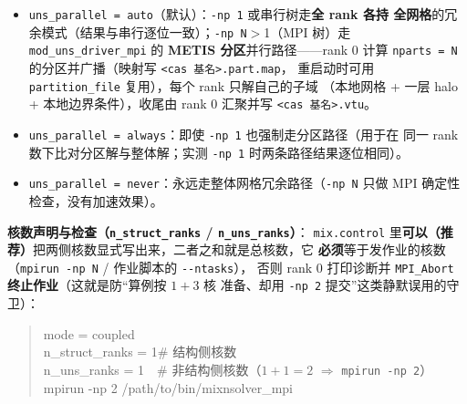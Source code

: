 \documentclass[11pt,a4paper]{ctexart}
\begin{document}
\begin{itemize}\itemsep2pt
  \item \texttt{uns\_parallel = auto}（默认）：\texttt{-np 1} 或串行树走\textbf{全 rank 各持
        全网格}的冗余模式（结果与串行逐位一致）；\texttt{-np N}$>$1（MPI 树）走
        \texttt{mod\_uns\_driver\_mpi} 的 \textbf{METIS 分区}并行路径——rank 0 计算
        \texttt{nparts = N} 的分区并广播（映射写 \texttt{<cas 基名>.part.map}，
        重启动时可用 \texttt{partition\_file} 复用），每个 rank 只解自己的子域
        （本地网格 + 一层 halo + 本地边界条件），收尾由 rank 0 汇聚并写
        \texttt{<cas 基名>.vtu}。
  \item \texttt{uns\_parallel = always}：即使 \texttt{-np 1} 也强制走分区路径（用于在
        同一 rank 数下比对分区解与整体解；实测 \texttt{-np 1} 时两条路径结果逐位相同）。
  \item \texttt{uns\_parallel = never}：永远走整体网格冗余路径（\texttt{-np N} 只做 MPI
        确定性检查，没有加速效果）。
\end{itemize}

\textbf{核数声明与检查（\texttt{n\_struct\_ranks} / \texttt{n\_uns\_ranks}）}：
\texttt{mix.control} 里\textbf{可以（推荐）}把两侧核数显式写出来，二者之和就是总核数，它
\textbf{必须}等于发作业的核数（\texttt{mpirun -np N} / 作业脚本的 \texttt{-{}-ntasks}），
否则 rank 0 打印诊断并 \texttt{MPI\_Abort} \textbf{终止作业}（这就是防“算例按 $1+3$ 核
准备、却用 \texttt{-np 2} 提交”这类静默误用的守卫）：

\begin{quote}\ttfamily\small
mode = coupled\\
n\_struct\_ranks = 1\quad\# 结构侧核数\\
n\_uns\_ranks = 1\quad\ \ \# 非结构侧核数（$1+1=2$ $\Rightarrow$ \texttt{mpirun -np 2}）\\
mpirun -np 2 /path/to/bin/mixnsolver\_mpi
\end{quote}
\end{document}
